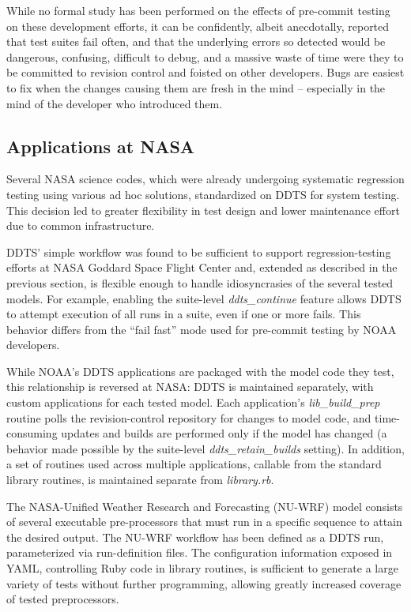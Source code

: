 \documentclass[conference]{IEEEtran}
\begin{document}
While no formal study has been performed on the effects of pre-commit testing on these development efforts, it can be confidently, albeit anecdotally, reported that test suites fail often, and that the underlying errors so detected would be dangerous, confusing, difficult to debug, and a massive waste of time were they to be committed to revision control and foisted on other developers. Bugs are easiest to fix when the changes causing them are fresh in the mind -- especially in the mind of the developer who introduced them.

\subsection{Applications at NASA}

Several NASA science codes, which were already undergoing systematic regression testing using various ad hoc solutions, standardized on DDTS for system testing. This decision led to greater flexibility in test design and lower maintenance effort due to common infrastructure.

DDTS' simple workflow was found to be sufficient to support regression-testing efforts at NASA Goddard Space Flight Center and, extended as described in the previous section, is flexible enough to handle idiosyncrasies of the several tested models. For example, enabling the suite-level \emph{ddts\_continue} feature allows DDTS to attempt execution of all runs in a suite, even if one or more fails. This behavior differs from the ``fail fast'' mode used for pre-commit testing by NOAA developers.

While NOAA's DDTS applications are packaged with the model code they test, this relationship is reversed at NASA: DDTS is maintained separately, with custom applications for each tested model. Each application's \emph{lib\_build\_prep} routine polls the revision-control repository for changes to model code, and time-consuming updates and builds are performed only if the model has changed (a behavior made possible by the suite-level \emph{ddts\_retain\_builds} setting). In addition, a set of routines used across multiple applications, callable from the standard library routines, is maintained separate from \emph{library.rb}.

The NASA-Unified Weather Research and Forecasting (NU-WRF) \cite{nuwrf} model consists of several executable pre-processors that must run in a specific sequence to attain the desired output. The NU-WRF workflow has been defined as a DDTS run, parameterized via run-definition files. The configuration information exposed in YAML, controlling Ruby code in library routines, is sufficient to generate a large variety of tests without further programming, allowing greatly increased coverage of tested preprocessors.
\end{document}
